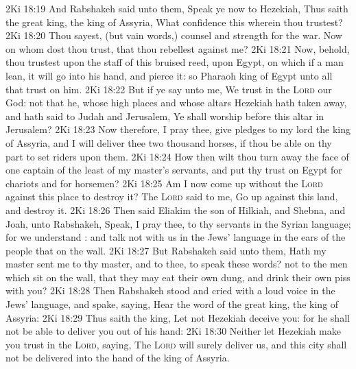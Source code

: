 \vs 2Ki 18:19 And Rabshakeh said unto them, Speak ye now to Hezekiah, Thus saith the great king, the king of Assyria, What confidence  this wherein thou trustest?
\vs 2Ki 18:20 Thou sayest, (but  vain words,)  counsel and strength for the war. Now on whom dost thou trust, that thou rebellest against me?
\vs 2Ki 18:21 Now, behold, thou trustest upon the staff of this bruised reed,  upon Egypt, on which if a man lean, it will go into his hand, and pierce it: so  Pharaoh king of Egypt unto all that trust on him.
\vs 2Ki 18:22 But if ye say unto me, We trust in the \textsc{Lord} our God:  not that he, whose high places and whose altars Hezekiah hath taken away, and hath said to Judah and Jerusalem, Ye shall worship before this altar in Jerusalem?
\vs 2Ki 18:23 Now therefore, I pray thee, give pledges to my lord the king of Assyria, and I will deliver thee two thousand horses, if thou be able on thy part to set riders upon them.
\vs 2Ki 18:24 How then wilt thou turn away the face of one captain of the least of my master's servants, and put thy trust on Egypt for chariots and for horsemen?
\vs 2Ki 18:25 Am I now come up without the \textsc{Lord} against this place to destroy it? The \textsc{Lord} said to me, Go up against this land, and destroy it.
\vs 2Ki 18:26 Then said Eliakim the son of Hilkiah, and Shebna, and Joah, unto Rabshakeh, Speak, I pray thee, to thy servants in the Syrian language; for we understand : and talk not with us in the Jews' language in the ears of the people that  on the wall.
\vs 2Ki 18:27 But Rabshakeh said unto them, Hath my master sent me to thy master, and to thee, to speak these words?  not  to the men which sit on the wall, that they may eat their own dung, and drink their own piss with you?
\vs 2Ki 18:28 Then Rabshakeh stood and cried with a loud voice in the Jews' language, and spake, saying, Hear the word of the great king, the king of Assyria:
\vs 2Ki 18:29 Thus saith the king, Let not Hezekiah deceive you: for he shall not be able to deliver you out of his hand:
\vs 2Ki 18:30 Neither let Hezekiah make you trust in the \textsc{Lord}, saying, The \textsc{Lord} will surely deliver us, and this city shall not be delivered into the hand of the king of Assyria.
